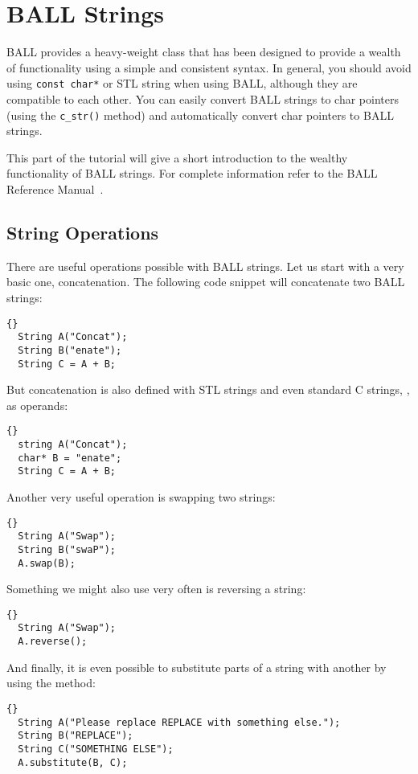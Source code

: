 \section{BALL Strings}

BALL provides a heavy-weight  class that has been designed
to provide a wealth of functionality using a simple and consistent syntax.
In general, you should avoid using {\tt const char*} or STL string when using
BALL, although they are compatible to each other. You can easily convert BALL
strings to char pointers (using the {\tt c\_str()} method) and automatically
convert char pointers to BALL strings.

This part of the tutorial will give a short introduction to the wealthy
functionality of BALL strings. For complete information refer to the BALL
Reference Manual~\cite{BALL-RM}.

\subsection{String Operations}

There are useful operations possible with BALL strings. Let us start with a
very basic one, concatenation. The following code snippet will concatenate two
BALL strings:
\begin{lstlisting}{}
  String A("Concat");
  String B("enate");
  String C = A + B;
\end{lstlisting}
But concatenation is also defined with STL strings and even standard C
strings, , as operands:
\begin{lstlisting}{}
  string A("Concat");
  char* B = "enate";
  String C = A + B;
\end{lstlisting}

\noindent
Another very useful operation is swapping two strings:
\begin{lstlisting}{}
  String A("Swap");
  String B("swaP");
  A.swap(B);
\end{lstlisting}

\noindent
Something we might also use very often is reversing a string:
\begin{lstlisting}{}
  String A("Swap");
  A.reverse();
\end{lstlisting}

\noindent
And finally, it is even possible to substitute parts of a string with another
 by using the  method:
\begin{lstlisting}{}
  String A("Please replace REPLACE with something else.");
  String B("REPLACE");
  String C("SOMETHING ELSE");
  A.substitute(B, C);
\end{lstlisting}


